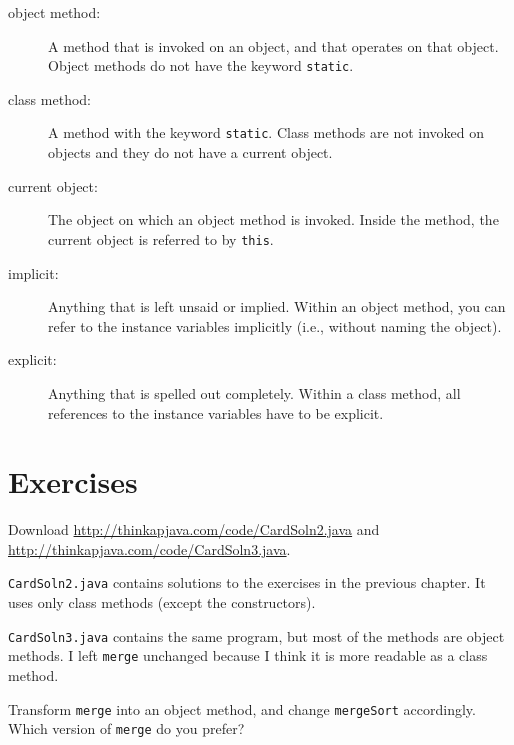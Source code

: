 \begin{description}

\item[object method:]  A method that is invoked on an object,
and that operates on that object.
Object methods do not have the keyword {\tt static}.

\item[class method:]  A method with the keyword {\tt static}.
Class methods are not invoked on objects and they do not have
a current object.

\item[current object:]  The object on which an object method
is invoked.  Inside the method,
the current object is referred to by {\tt this}.


\item[implicit:]  Anything that is left unsaid or implied.  Within
an object method, you can refer to the instance variables
implicitly (i.e., without naming the object).

\item[explicit:]  Anything that is spelled out completely.  Within
a class method, all references to the instance variables have to
be explicit.


\end{description}


\section{Exercises}

\begin{exercise}

Download \url{http://thinkapjava.com/code/CardSoln2.java} and
\url{http://thinkapjava.com/code/CardSoln3.java}.

{\tt CardSoln2.java} contains solutions to the exercises
in the previous chapter.  It uses only class methods (except the
constructors).

{\tt CardSoln3.java} contains the same program, but most of the
methods are object methods.  I left {\tt merge} unchanged because
I think it is more readable as a class method.

Transform {\tt merge} into an object method,
and change {\tt mergeSort} accordingly.  Which version of
{\tt merge} do you prefer?

\end{exercise}


